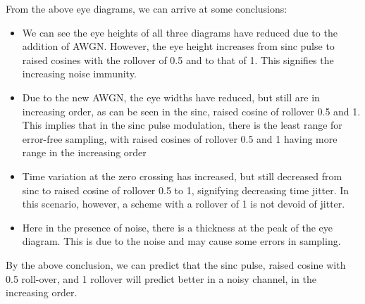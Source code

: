 \documentclass{article}
\begin{document}
        From the above eye diagrams, we can arrive at some conclusions:
        \begin{itemize}
            \item We can see the eye heights of all three diagrams have reduced due to the addition of AWGN. However, the eye height increases from sinc pulse to raised cosines with the rollover of 0.5 and to that of 1. This signifies the increasing noise immunity.
            \item Due to the new AWGN, the eye widths have reduced, but still are in increasing order, as can be seen in the sinc, raised cosine of rollover 0.5 and 1. This implies that in the sinc pulse modulation, there is the least range for error-free sampling, with raised cosines of rollover 0.5 and 1 having more range in the increasing order
            \item Time variation at the zero crossing has increased, but still decreased from sinc to raised cosine of rollover 0.5 to 1, signifying decreasing time jitter. In this scenario, however, a scheme with a rollover of 1 is not devoid of jitter. 
            \item Here in the presence of noise, there is a thickness at the peak of the eye diagram. This is due to the noise and may cause some errors in sampling.
        \end{itemize} 

        By the above conclusion, we can predict that the sinc pulse, raised cosine with 0.5 roll-over, and 1 rollover will predict better in a noisy channel, in the increasing order. \\\\\\
\end{document}
